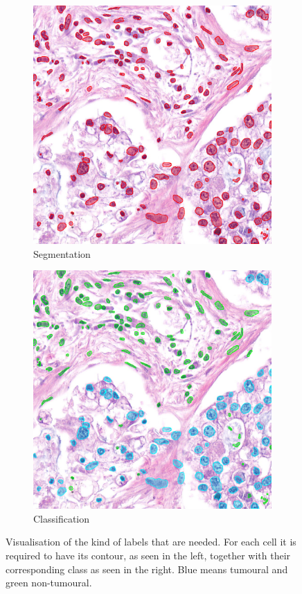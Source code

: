 \begin{figure}[ht]
  \centering
  \begin{subfigure}[b]{0.45\textwidth}
    \includegraphics[width=\textwidth]{imgs/seg.png}
    \caption{Segmentation}
    \label{fig:seg}
  \end{subfigure}
  \hfill
  \begin{subfigure}[b]{0.45\textwidth}
    \includegraphics[width=\textwidth]{imgs/overlay.png}
    \caption{Classification}
    \label{fig:class}
  \end{subfigure}
  \caption{Visualisation of the kind of labels that are needed. For each cell it is required to have its contour, as seen in the left, together with their corresponding class as seen in the right. Blue means tumoural and green non-tumoural.}
  \label{fig:labels}
\end{figure}

